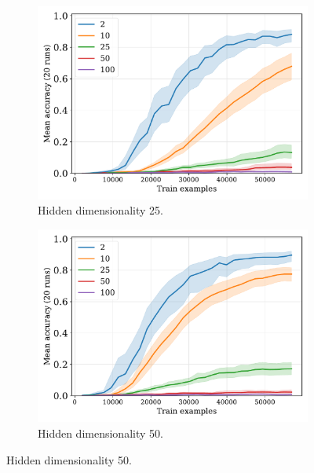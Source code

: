 \documentclass{article}
\begin{document}
\begin{figure}[H]
  \begin{subfigure}{0.45\linewidth}
    \includegraphics[width=1\textwidth]{./fuzzy-lm-vocab20-pretrain-3tasks-train_size-embed_dim-hidden_dim=25.pdf}
    \caption{Hidden dimensionality 25.}
  \end{subfigure}
  \hfill
  \begin{subfigure}{0.45\linewidth}
    \includegraphics[width=1\textwidth]{./fuzzy-lm-vocab20-pretrain-3tasks-train_size-embed_dim-hidden_dim=50.pdf}
    \caption{Hidden dimensionality 50.}
  \end{subfigure}

  \vspace{24pt}


\end{figure}
\end{document}
